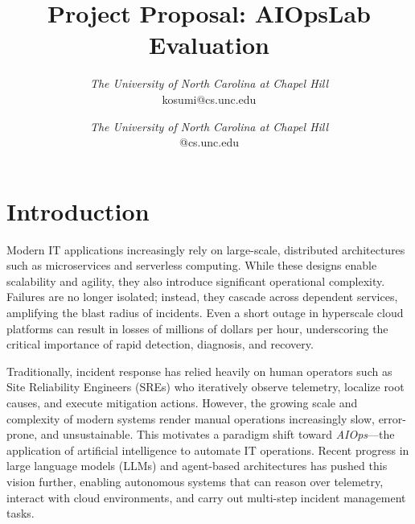 \documentclass[conference]{IEEEtran}
\begin{document}
\title{Project Proposal: AIOpsLab Evaluation}
\author{
\textit{The University of North Carolina at
Chapel Hill}\\
kosumi@cs.unc.edu
\and
{}
\textit{The University of North Carolina at
Chapel Hill}\\
@cs.unc.edu}

\maketitle



\section{Introduction}

Modern IT applications increasingly rely on large-scale, distributed architectures such as microservices and serverless computing. While these designs enable scalability and agility, they also introduce significant operational complexity. Failures are no longer isolated; instead, they cascade across dependent services, amplifying the blast radius of incidents. Even a short outage in hyperscale cloud platforms can result in losses of millions of dollars per hour, underscoring the critical importance of rapid detection, diagnosis, and recovery.

Traditionally, incident response has relied heavily on human operators such as Site Reliability Engineers (SREs) who iteratively observe telemetry, localize root causes, and execute mitigation actions. However, the growing scale and complexity of modern systems render manual operations increasingly slow, error-prone, and unsustainable. This motivates a paradigm shift toward \textit{AIOps}---the application of artificial intelligence to automate IT operations. Recent progress in large language models (LLMs) and agent-based architectures has pushed this vision further, enabling autonomous systems that can reason over telemetry, interact with cloud environments, and carry out multi-step incident management tasks.
\end{document}
